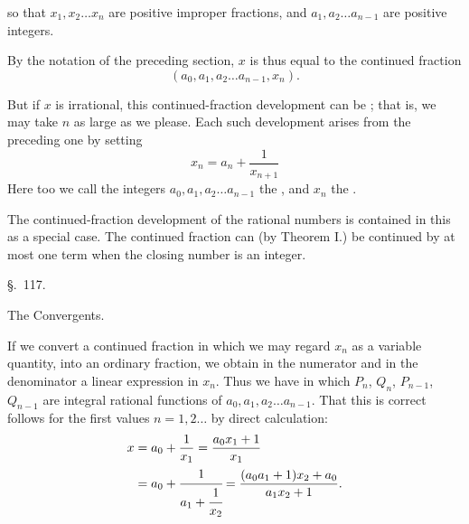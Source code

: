 so that $x_1, x_2 \ldots x_n$ are positive improper fractions, and $a_1, a_2 \ldots a_{n-1}$ are positive integers.

By the notation of the preceding section, $x$ is thus equal to the continued fraction
\[
(a_0, a_1, a_2 \ldots a_{n-1}, x_n).
\]

But if $x$ is irrational, this continued-fraction development can be ; that is, we may take $n$ as large as we please. Each such development arises from the preceding one by setting
\[
x_n = a_n + \frac{1}{x_{n+1}}
\]
Here too we call the integers $a_0, a_1, a_2 \ldots a_{n-1}$ the , and $x_n$ the .

The continued-fraction development of the rational numbers is contained in this as a special case. The continued fraction can (by Theorem I.) be continued by at most one term when the closing number is an integer.

\begin{center}
\S.\ 117.

The Convergents.
\end{center}

If we convert a continued fraction
in which we may regard $x_n$ as a variable quantity, into an ordinary fraction, we obtain in the numerator and in the denominator a linear expression in $x_n$. Thus we have
in which $P_n$, $Q_n$, $P_{n-1}$, $Q_{n-1}$ are integral rational functions of $a_0, a_1, a_2 \ldots a_{n-1}$. That this is correct follows for the first values $n = 1, 2 \ldots$ by direct calculation:
\[
\begin{aligned}
x &= a_0 + \frac{1}{x_1} = \frac{a_0 x_1 + 1}{x_1}\\
&= a_0 + \cfrac{1}{a_1 + \cfrac{1}{x_2}} = \frac{(a_0 a_1 + 1)x_2 + a_0}{a_1 x_2 + 1}.
\end{aligned}
\]
